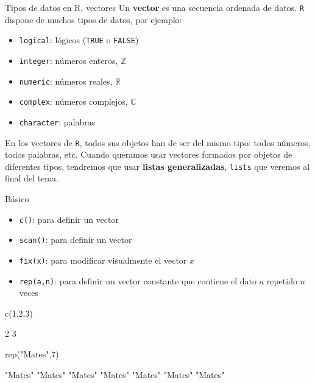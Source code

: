 \documentclass[
  ignorenonframetext,
  aspectratio=169]{beamer}
\newenvironment{Shaded}{\begin{snugshade}}{\end{snugshade}}
\newcommand{\DecValTok}[1]{\textcolor[rgb]{0.00,0.00,0.81}{#1}}
\newcommand{\FunctionTok}[1]{\textcolor[rgb]{0.00,0.00,0.00}{#1}}
\newcommand{\NormalTok}[1]{#1}
\newcommand{\StringTok}[1]{\textcolor[rgb]{0.31,0.60,0.02}{#1}}
\providecommand{\tightlist}{%
  \setlength{\itemsep}{0pt}\setlength{\parskip}{0pt}}
\let\oldverbatim\verbatim
\let\endoldverbatim\endverbatim
\renewenvironment{verbatim}{\tiny\oldverbatim}{\endoldverbatim}
\begin{document}
\begin{frame}[fragile]{Tipos de datos en R, vectores}
\protect\hypertarget{tipos-de-datos-en-r-vectores}{}
Un \textbf{vector} es una secuencia ordenada de datos. \texttt{R}
dispone de muchos tipos de datos, por ejemplo:

\begin{itemize}
\tightlist
\item
  \texttt{logical}: lógicos (\texttt{TRUE} o \texttt{FALSE})
\item
  \texttt{integer}: números enteros, \(\mathbb Z\)
\item
  \texttt{numeric}: números reales, \(\mathbb R\)
\item
  \texttt{complex}: números complejos, \(\mathbb C\)
\item
  \texttt{character}: palabras
\end{itemize}

En los vectores de \texttt{R}, todos sus objetos han de ser del mismo
tipo: todos números, todos palabras, etc. Cuando queramos usar vectores
formados por objetos de diferentes tipos, tendremos que usar
\textbf{listas generalizadas}, \texttt{lists} que veremos al final del
tema.
\end{frame}

\begin{frame}[fragile]{Básico}
\protect\hypertarget{buxe1sico}{}
\begin{itemize}
\tightlist
\item
  \texttt{c()}: para definir un vector
\item
  \texttt{scan()}: para definir un vector
\item
  \texttt{fix(x)}: para modificar visualmente el vector \(x\)
\item
  \texttt{rep(a,n)}: para definir un vector constante que contiene el
  dato \(a\) repetido \(n\) veces
\end{itemize}

\begin{Shaded}
\begin{Highlighting}[]
\FunctionTok{c}\NormalTok{(}\DecValTok{1}\NormalTok{,}\DecValTok{2}\NormalTok{,}\DecValTok{3}\NormalTok{)}
\end{Highlighting}
\end{Shaded}

\begin{verbatim}
[1] 1 2 3
\end{verbatim}

\begin{Shaded}
\begin{Highlighting}[]
\FunctionTok{rep}\NormalTok{(}\StringTok{"Mates"}\NormalTok{,}\DecValTok{7}\NormalTok{)}
\end{Highlighting}
\end{Shaded}

\begin{verbatim}
[1] "Mates" "Mates" "Mates" "Mates" "Mates" "Mates" "Mates"
\end{verbatim}
\end{frame}
\end{document}
